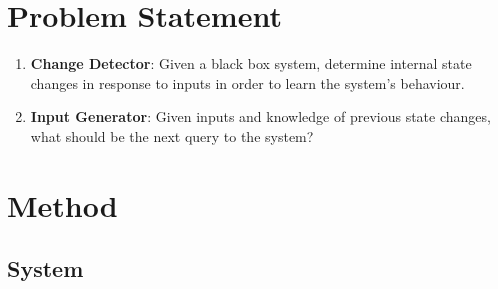 \documentclass[11pt, a4paper]{article}
\begin{document}










\section*{Problem Statement} 

\begin{enumerate}
    \item \textbf{Change Detector}: Given a black box system, determine internal state changes in response to inputs in order to learn the system's behaviour.
    \item \textbf{Input Generator}: Given inputs and knowledge of previous state changes, what should be the next query to the system?
\end{enumerate}

\section*{Method}

\subsection*{System}
\end{document}
